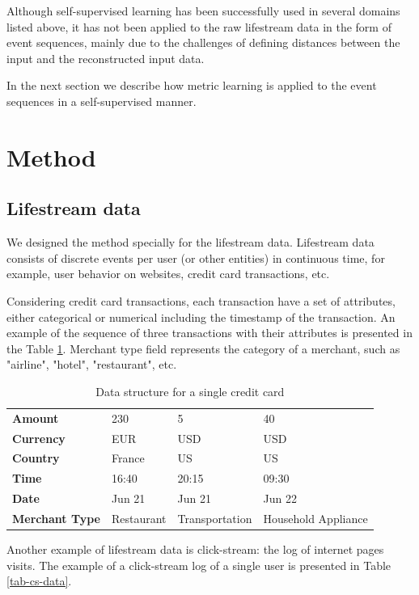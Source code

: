 \documentclass[sigconf, anonymous]{acmart}
\begin{document}
Although self-supervised learning has been successfully used in several domains listed above, it has not been applied to the raw lifestream data in the form of event sequences, mainly due to the challenges of defining distances between the input and the reconstructed input data.

In the next section we describe how metric learning is applied to the event sequences in a self-supervised manner.

\section{Method} \label{sec-method}

\subsection{Lifestream data}

We designed the method specially for the lifestream data. Lifestream data consists of discrete events per user (or other entities) in continuous time, for example, user behavior on websites, credit card transactions, etc. 

Considering credit card transactions, each transaction have a set of attributes, either categorical or numerical including the timestamp of the transaction. An example of the sequence of three transactions with their attributes is presented in the Table \ref{tab-tr-data}.
Merchant type field represents the category of a merchant, such as "airline", "hotel", "restaurant", etc.

\begin{table}[ht]
\caption{Data structure for a single credit card}
\begin{tabular}{ | m{7em} |  m{5em} m{5em} m{5em}| }
\hline
\textbf{Amount} & 230 & 5 & 40 \\
\textbf{Currency} & EUR & USD & USD \\
\textbf{Country} & France & US & US \\
\textbf{Time} & 16:40 & 20:15 & 09:30 \\
\textbf{Date} & Jun 21 & Jun 21 & Jun 22 \\
\textbf{Merchant Type} & Restaurant & Transport\-ation & Household Appliance \\
\hline
\end{tabular}
\label{tab-tr-data}
\end{table}

Another example of lifestream data is click-stream: the log of internet pages  visits. The example of a click-stream log of a single user is presented in Table \ref{tab-cs-data}.
\end{document}
